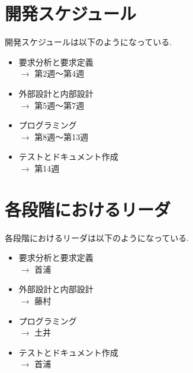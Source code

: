 \documentclass[dvipdfmx, 11pt]{jsarticle}
\begin{document}
\section{開発スケジュール}
    開発スケジュールは以下のようになっている.
    \begin{itemize}
        \item 要求分析と要求定義 \\       
            $\rightarrow$ 第2週〜第4週
        \item 外部設計と内部設計 \\
            $\rightarrow$ 第5週〜第7週
        \item プログラミング \\
            $\rightarrow$ 第8週〜第13週
        \item テストとドキュメント作成 \\
            $\rightarrow$ 第14週
    \end{itemize}

\section{各段階におけるリーダ}
    各段階におけるリーダは以下のようになっている.
    \begin{itemize}
        \item 要求分析と要求定義 \\       
            $\rightarrow$ 首浦
        \item 外部設計と内部設計 \\
            $\rightarrow$ 藤村
        \item プログラミング \\
            $\rightarrow$ 土井
        \item テストとドキュメント作成 \\
            $\rightarrow$ 首浦
    \end{itemize}

% 
% 
\end{document}
